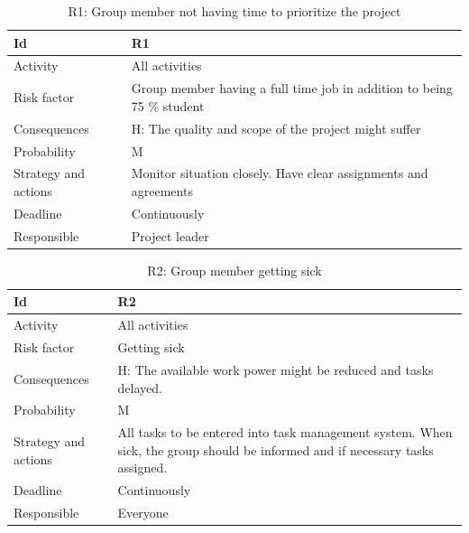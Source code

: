 \documentclass[11pt]{book}
\begin{document}
\begin{table}[H]
\centering
\begin{tabular}{ l  p{11cm} }
    Id                      & R1                                                                          \\ \hline
    Activity                & All activities                                                              \\ \hline
    Risk factor             & Group member having a full time job in addition to being 75 \% student      \\ \hline
    Consequences            & H: The quality and scope of the project might suffer                        \\ \hline
    Probability             & M                                                                           \\ \hline
    Strategy and actions    & Monitor situation closely. Have clear assignments and agreements            \\ \hline
    Deadline                & Continuously                                                                \\ \hline
    Responsible             & Project leader                                                              \\ 
\end{tabular}
\caption{R1: Group member not having time to prioritize the project}
\label{tab:risk_1}
\end{table}

\begin{table}[H]
\centering
\begin{tabular}{ l  p{11cm} }
    Id                      & R2                                                                          \\ \hline
    Activity                & All activities                                                              \\ \hline
    Risk factor             & Getting sick                                                                \\ \hline
    Consequences            & H: The available work power might be reduced and tasks delayed.             \\ \hline
    Probability             & M                                                                           \\ \hline
    Strategy and actions    & All tasks to be entered into task management system. 
                              When sick, the group should be informed and if necessary tasks assigned.    \\ \hline
    Deadline                & Continuously                                                                \\ \hline
    Responsible             & Everyone\\
\end{tabular}
\caption{R2: Group member getting sick}
\label{tab:risk_2}
\end{table}
\end{document}
